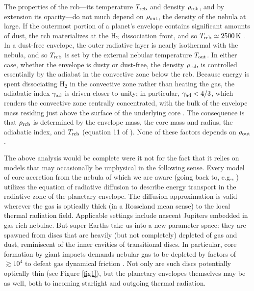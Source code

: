 \documentclass[fleqn,useAMS,usenatbib]{mnras}
\begin{document}
The properties of the rcb---its temperature $T_{\rm rcb}$ and
density $\rho_{\rm rcb}$, and by extension its opacity---do not much depend 
on $\rho_{\rm out}$, the density of the nebula at large. If the outermost
portion of a planet's envelope contains significant amounts of dust,
the rcb materializes at the
${\rm H}_2$ dissociation front, and so
$T_{\rm rcb} \simeq 2500\,{\rm K}$ \citep{paper1}.
In a dust-free envelope, the outer radiative layer is nearly isothermal
with the nebula, and so $T_{\rm rcb}$ is set by the external nebular 
temperature $T_{\rm out}$. 
In either case, whether the envelope is dusty or dust-free, the density $\rho_{\rm rcb}$ is controlled essentially by the adiabat in the convective zone below the rcb. Because energy is spent dissociating H$_2$ in the convective zone rather than
heating the gas, the adiabatic index 
$\gamma_{\rm ad}$ is driven closer to unity;  
in particular, $\gamma_{\rm ad} < 4/3$, 
which renders the convective zone centrally concentrated, with the bulk
of the envelope mass residing just above the surface of the underlying
core \citep{paper2}. 
The consequence is that $\rho_{\rm rcb}$ is determined by the envelope
mass, the core mass and radius, the adiabatic index, and $T_{\rm rcb}$ (equation 11 of \citealt{paper2}).
None of these factors depends on $\rho_{\rm out}$.

The above analysis would be complete were it not for the
fact that it relies on models that
may occasionally be
unphysical in the following sense. 
Every model of core accretion from the nebula
of which
we are aware (going back to, e.g., \citealt{pollack96}) utilizes
the equation of radiative diffusion to describe energy transport
in the radiative zone of the planetary envelope. The diffusion approximation
is valid wherever the gas is optically thick (in a Rosseland mean sense)
to the local thermal radiation field. Applicable settings include
nascent Jupiters embedded in gas-rich nebulae. 
But super-Earths take us into a new parameter space: they are spawned
from discs that are heavily (but not completely) depleted 
of gas and dust, reminiscent of the inner cavities of transitional discs.
In particular, core formation by giant impacts 
demands nebular gas to be depleted by factors of $\gtrsim 10^4$ to defeat 
gas dynamical friction \citep[see, e.g.,][their Figures 5 and 6]{paper3}.
Not only are such discs potentially optically thin (see Figure \ref{fig1}),
but the planetary envelopes themselves may be as well, both to
incoming starlight and outgoing thermal radiation.
\end{document}
